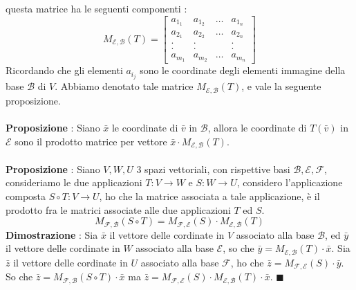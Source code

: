 \documentclass[12pt, letterpaper]{article}
\newcommand{\E}{{\mathcal E}}
\newcommand{\B}{{\mathcal B}}
\newcommand{\ve}{{\bar v}}
\newcommand{\acc}{\\\hphantom{}\\}
\begin{document}
 questa matrice ha le seguenti componenti : $$
 M_{\E,\B}(T)=\begin{bmatrix}
    a_{1_1}&a_{1_2}&\dots&a_{1_n}\\
    a_{2_1}&a_{2_2}&\dots&a_{2_n}\\
    .&.&&.\\.&.&&.\\
    a_{m_1}&a_{m_2}&\dots&a_{m_n}
 \end{bmatrix}
 $$
 Ricordando che gli elementi \(a_{i_j}\) sono le coordinate degli elementi immagine della base \(\B\) di \(V\).
 Abbiamo denotato tale matrice \(M_{\E,\B}(T)\), e vale la seguente proposizione.\acc
 \textbf{Proposizione} : Siano \(\bar x\) le coordinate di \(\ve\) in \(\B\), allora le coordinate di 
 \(T(\ve)\) in \(\E\) sono il prodotto matrice per vettore \(\bar x\cdot M_{\E,\B}(T)\).
 \acc 
 \textbf{Proposizione} : Siano \(V,W,U\) 3 spazi vettoriali, con rispettive basi \(\B,\E,\mathcal{F}\), consideriamo le due 
 applicazioni \(T:V\rightarrow W\) e \(S:W\rightarrow U\), considero l'applicazione composta \(S\circ T:V\rightarrow U\), 
 ho che la matrice associata a tale applicazione, è il prodotto fra le matrici associate alle due applicazioni \(T\) ed \(S\).
 $$M_{\mathcal{F},\B}(S\circ T)=M_{\mathcal{F},\E}(S)\cdot M_{\E,\B}(T)$$
 \textbf{Dimostrazione} : Sia \(\bar x\) il vettore delle cordinate in \(V\) associato alla 
 base \(\B\), ed \(\bar y\) il vettore delle cordinate in \(W\) associato alla 
 base \(\E\), so che \(\bar y = M_{\E,\B}(T)\cdot \bar x\). Sia \(\bar z\) il vettore delle cordinate in \(U\) associato alla 
 base \(\mathcal{F}\), ho che \(\bar z = M_{\mathcal{F},\E}(S)\cdot \bar y\). So che 
 \(\bar z = M_{\mathcal{F},\B}(S\circ T)\cdot \bar x\) ma \(\bar z = M_{\mathcal{F},\E}(S)\cdot M_{\E,\B}(T)\cdot \bar x\). \(\blacksquare\)
\end{document}
